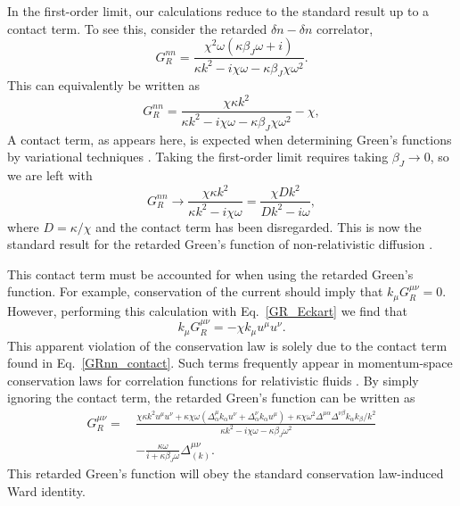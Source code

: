 \documentclass[aps,prd,nofootinbib,amsmath,amssymb,showpacs,longbibliography,singlecolumn,superscriptaddress,notitlepage]{revtex4-1}
\theoremstyle{plain}
\theoremstyle{definition}
\begin{document}
In the first-order limit, our calculations reduce to the standard result up to a contact term. To see this, consider the retarded $\delta n-\delta n$ correlator, 
\begin{equation}
    G_R^{nn} = \frac{\chi^2 \omega \left( \kappa \beta_J \omega + i \right)}{\kappa k^2 - i \chi \omega - \kappa \beta_J \chi \omega^2} .
\end{equation}
This can equivalently be written as 
\begin{equation} \label{GRnn_contact}
    G_R^{nn} = \frac{\chi \kappa k^2}{\kappa k^2 - i \chi \omega - \kappa \beta_J \chi \omega^2} - \chi ,
\end{equation}
A contact term, as appears here, is expected when determining Green's functions by variational techniques \cite{Kovtun:2012rj}. Taking the first-order limit requires taking $\beta_J \rightarrow 0$, so we are left with
\begin{equation}
    G_R^{nn} \rightarrow \frac{\chi \kappa k^2}{\kappa k^2 - i\chi \omega} = \frac{\chi D k^2}{Dk^2 - i \omega} ,
\end{equation}
where $D = \kappa / \chi$ and the contact term has been disregarded. This is now the standard result for the retarded Green's function of non-relativistic diffusion \cite{Kovtun:2012rj}. 

This contact term must be accounted for when using the retarded Green's function. For example, conservation of the current should imply that $k_{\mu} G_R^{\mu\nu} = 0$. However, performing this calculation with Eq.\ \eqref{GR_Eckart} we find that
\begin{equation}
    k_{\mu} G_R^{\mu\nu} = -\chi k_{\mu} u^{\mu} u^{\nu} .
\end{equation}
This apparent violation of the conservation law is solely due to the contact term found in Eq.\ \eqref{GRnn_contact}. Such terms frequently appear in momentum-space conservation laws for correlation functions for relativistic fluids \cite{Kovtun:2012rj}. By simply ignoring the contact term, the retarded Green's function can be written as
\begin{equation} \label{GR_Eckart_nocontact}
\begin{split}
    G_R^{\mu\nu} = \, & \frac{\chi \kappa k^2 u^{\mu} u^{\nu} + \kappa \chi \omega ( \Delta^{\mu}_{\alpha} k_{\alpha} u^{\nu} + \Delta^{\nu}_{\alpha} k_{\alpha} u^{\mu}) + \kappa \chi \omega^2 \Delta^{\mu\alpha} \Delta^{\nu\beta} k_{\alpha} k_{\beta} / k^2}{\kappa k^2 - i \chi \omega - \kappa \beta_J \omega^2}  \\
    & - \frac{\kappa \omega}{i + \kappa \beta_J \omega} \Delta_{(k)}^{\mu\nu} .
\end{split}
\end{equation}
This retarded Green's function will obey the standard conservation law-induced Ward identity. 
\end{document}
